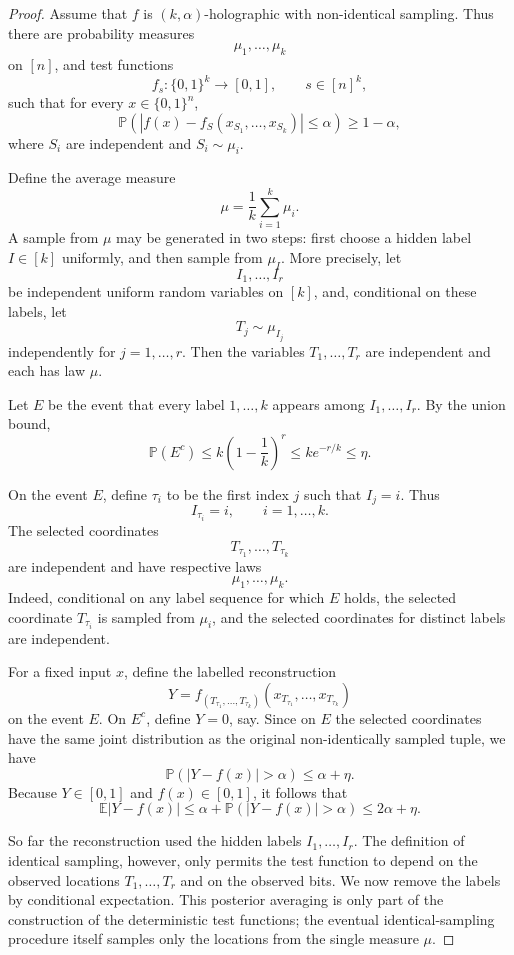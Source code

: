 \documentclass[10pt,a4paper]{amsart}
\begin{document}
\begin{proof}
Assume that \(f\) is \((k,\alpha)\)-holographic with non-identical sampling.
Thus there are probability measures
\[
        \mu_1,\ldots,\mu_k
\]
on \([n]\), and test functions
\[
        f_s:\{0,1\}^k\to[0,1],
        \qquad s\in[n]^k,
\]
such that for every \(x\in\{0,1\}^n\),
\[
        \mathbb P\left(
        \left|f(x)-f_S(x_{S_1},\ldots,x_{S_k})\right|
        \leq \alpha
        \right)
        \geq 1-\alpha ,
\]
where \(S_i\) are independent and \(S_i\sim\mu_i\).

Define the average measure
\[
        \mu=\frac1k\sum_{i=1}^k \mu_i .
\]
A sample from \(\mu\) may be generated in two steps: first choose a hidden label
\(I\in[k]\) uniformly, and then sample from \(\mu_I\).  More precisely, let
\[
        I_1,\ldots,I_r
\]
be independent uniform random variables on \([k]\), and, conditional on these
labels, let
\[
        T_j\sim \mu_{I_j}
\]
independently for \(j=1,\ldots,r\).  Then the variables \(T_1,\ldots,T_r\) are
independent and each has law \(\mu\).

Let \(E\) be the event that every label \(1,\ldots,k\) appears among
\(I_1,\ldots,I_r\).  By the union bound,
\[
        \mathbb P(E^c)
        \leq
        k\left(1-\frac1k\right)^r
        \leq
        k e^{-r/k}
        \leq \eta .
\]

On the event \(E\), define \(\tau_i\) to be the first index \(j\) such that
\(I_j=i\).  Thus
\[
        I_{\tau_i}=i,
        \qquad i=1,\ldots,k.
\]
The selected coordinates
\[
        T_{\tau_1},\ldots,T_{\tau_k}
\]
are independent and have respective laws
\[
        \mu_1,\ldots,\mu_k.
\]
Indeed, conditional on any label sequence for which \(E\) holds, the selected
coordinate \(T_{\tau_i}\) is sampled from \(\mu_i\), and the selected
coordinates for distinct labels are independent.

For a fixed input \(x\), define the labelled reconstruction
\[
        Y
        =
        f_{(T_{\tau_1},\ldots,T_{\tau_k})}
        (x_{T_{\tau_1}},\ldots,x_{T_{\tau_k}})
\]
on the event \(E\).  On \(E^c\), define \(Y=0\), say.  Since on \(E\) the
selected coordinates have the same joint distribution as the original
non-identically sampled tuple, we have
\[
        \mathbb P\left(|Y-f(x)|>\alpha\right)
        \leq
        \alpha+\eta .
\]
Because \(Y\in[0,1]\) and \(f(x)\in[0,1]\), it follows that
\[
        \mathbb E |Y-f(x)|
        \leq
        \alpha+\mathbb P(|Y-f(x)|>\alpha)
        \leq
        2\alpha+\eta .
\]

So far the reconstruction used the hidden labels \(I_1,\ldots,I_r\).  The
definition of identical sampling, however, only permits the test function to
depend on the observed locations \(T_1,\ldots,T_r\) and on the observed bits.
We now remove the labels by conditional expectation.  This posterior averaging
is only part of the construction of the deterministic test functions; the
eventual identical-sampling procedure itself samples only the locations from
the single measure \(\mu\).


\end{proof}
\end{document}
